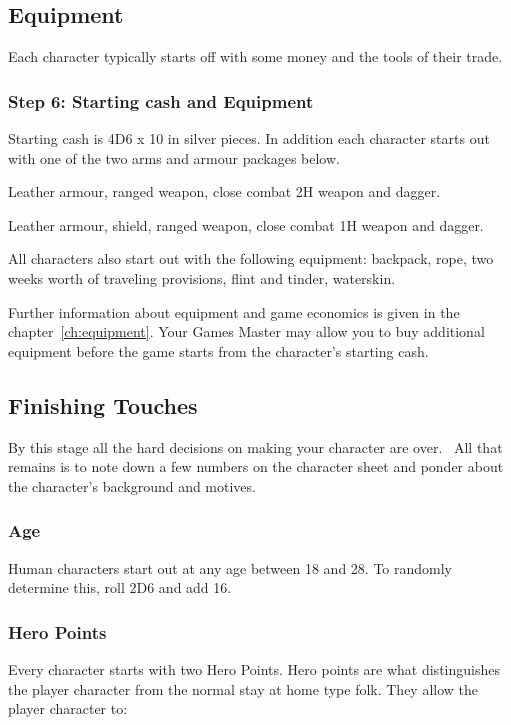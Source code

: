 \subsection{Equipment}
Each character typically starts off with some money and the tools of their trade.

\subsubsection{Step 6: Starting cash and Equipment}
Starting cash is 4D6 x 10 in silver pieces. In addition each character starts out with one of the two arms and armour packages below.

\begin{rpg-list}
	\item Leather armour, ranged weapon, close combat 2H weapon and dagger. 
	\item Leather armour, shield, ranged weapon, close combat 1H weapon and dagger.
\end{rpg-list}

All characters also start out with the following equipment: backpack, rope, two weeks worth of traveling provisions, flint and tinder, waterskin.

Further information about equipment and game economics is given in the chapter~\ref{ch:equipment}. Your Games Master may allow you to buy additional equipment before the game starts from the character’s starting cash.

\subsection{Finishing Touches}
By this stage all the hard decisions on making your character are over.  All that remains is to note down a few numbers on the character sheet and ponder about the character’s background and motives.

\subsubsection{Age}
Human characters start out at any age between 18 and 28. To randomly determine this, roll 2D6 and add 16. 

\subsubsection{Hero Points}
Every character starts with two Hero Points. Hero points are what distinguishes the player character from the normal stay at home type folk. They allow the player character to:

